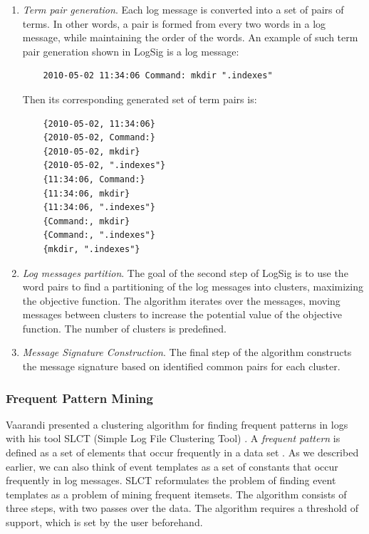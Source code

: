 \begin{enumerate}
    \item \textit{Term pair generation}. Each log message is converted into a set of pairs of terms. In other words, a pair is formed from every two words in a log message, while maintaining the order of the words. An example of such term pair generation shown in LogSig \cite{logsig2011} is a log message:
    
    \begin{verbatim}
    2010-05-02 11:34:06 Command: mkdir ".indexes"
    \end{verbatim}
    
    Then its corresponding generated set of term pairs is: \\
    \begin{verbatim}
    {2010-05-02, 11:34:06}
    {2010-05-02, Command:}
    {2010-05-02, mkdir}
    {2010-05-02, ".indexes"}
    {11:34:06, Command:}
    {11:34:06, mkdir}
    {11:34:06, ".indexes"}
    {Command:, mkdir}
    {Command:, ".indexes"}
    {mkdir, ".indexes"}
    \end{verbatim}

    \item \textit{Log messages partition}. The goal of the second step of LogSig is to use the word pairs to find a partitioning of the log messages into clusters, maximizing the objective function. The algorithm iterates over the messages, moving messages between clusters to increase the potential value of the objective function. The number of clusters is predefined. 
    
    \item \textit{Message Signature Construction}. The final step of the algorithm constructs the message signature based on identified common pairs for each cluster.
\end{enumerate}
    
\subsubsection*{Frequent Pattern Mining} 
Vaarandi presented a clustering algorithm for finding frequent patterns in logs with his tool SLCT (Simple Log File Clustering Tool) \cite{vaarandi2003}. A \textit{frequent pattern} is defined as a set of elements that occur frequently in a data set \cite{zhlhxzl2018}. As we described earlier, we can also think of event templates as a set of constants that occur frequently in log messages. SLCT reformulates the problem of finding event templates as a problem of mining frequent itemsets. The algorithm consists of three steps, with two passes over the data. The algorithm requires a threshold of support, which is set by the user beforehand. 

